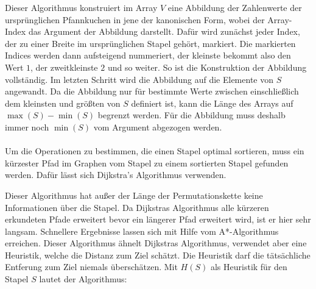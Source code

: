 \documentclass[a4paper,10pt,ngerman]{scrartcl}
\begin{document}
Dieser Algorithmus konstruiert im Array $V$ eine Abbildung der Zahlenwerte der ursprünglichen Pfannkuchen in
jene der kanonischen Form, wobei der Array-Index das Argument der Abbildung darstellt. Dafür wird zunächst jeder
Index, der zu einer Breite im ursprünglichen Stapel gehört, markiert. Die markierten Indices werden dann aufsteigend
nummeriert, der kleinste bekommt also den Wert $1$, der zweitkleinste $2$ und so weiter. So ist die Konstruktion
der Abbildung vollständig. Im letzten Schritt wird die Abbildung auf die Elemente von $S$ angewandt. Da die Abbildung
nur für bestimmte Werte zwischen einschließlich dem kleinsten und größten von $S$ definiert ist, kann die Länge des Arrays
auf $\max(S)-\min(S)$ begrenzt werden. Für die Abbildung muss deshalb immer noch $\min(S)$ vom Argument abgezogen werden.
\\\\
Um die Operationen zu bestimmen, die einen Stapel optimal sortieren, muss
ein kürzester Pfad im Graphen vom Stapel zu einem sortierten Stapel gefunden werden. Dafür lässt sich
Dijkstra's Algorithmus \cite{dijkstra_1959} verwenden.
\begin{algorithmic}
  \EndIf
  \EndIf
  \EndFor
  \EndWhile
  \EndProcedure
\end{algorithmic}
Dieser Algorithmus hat außer der Länge der Permutationskette keine Informationen über die Stapel.
Da Dijkstras Algorithmus alle kürzeren erkundeten Pfade erweitert bevor ein längerer Pfad erweitert
wird, ist er hier sehr langsam. Schnellere Ergebnisse lassen sich mit Hilfe vom A*-Algorithmus \cite{hart_1968} erreichen.
Dieser Algorithmus ähnelt Dijkstras Algorithmus, verwendet aber eine Heuristik, welche die Distanz zum
Ziel schätzt. Die Heuristik darf die tätsächliche Entferung zum Ziel niemals überschätzen. Mit $H(S)$ als Heuristik
für den Stapel $S$ lautet der Algorithmus:\\\\
\end{document}

